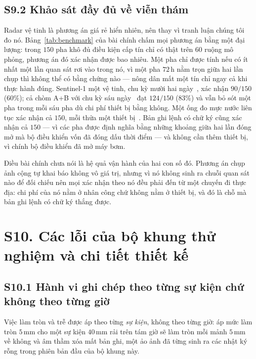 \subsection*{S9.2 Khảo sát đầy đủ về viễn thám}

Radar vệ tinh là phương án giá rẻ hiển nhiên, nên thay vì tranh luận chúng tôi đo nó.
Bảng~\ref{tab:benchmark} của bài chính chấm mọi phương án bằng một đại lượng: trong $150$
pha khô đủ điều kiện cấp tín chỉ có thật trên $60$ ruộng mô phỏng, phương án đó xác nhận
được bao nhiêu. Một pha chỉ được tính nếu có ít nhất một lần quan sát rơi vào trong nó, vì
một pha $72$\,h nằm trọn giữa hai lần chụp thì không thể có bằng chứng nào --- nông dân mất
một tín chỉ ngay cả khi thực hành đúng. Sentinel-1 một vệ tinh, chu kỳ mười hai
ngày~\cite{clauss2017s1}, xác nhận $90/150$ ($60\%$); cả chòm A+B với chu kỳ sáu
ngày~\cite{hashemi2022s1} đạt $124/150$ ($83\%$) và vẫn bỏ sót một pha trong mỗi sáu pha dù
chi phí thiết bị bằng không. Một ống đo mực nước liên tục xác nhận cả $150$, mỗi thửa một
thiết bị~\cite{delacruz2022}. Bản ghi lệnh có chữ ký cũng xác nhận cả $150$ --- vì các pha
được định nghĩa bằng những khoảng giữa hai lần đóng mở mà bộ điều khiển vốn đã đóng dấu
thời điểm --- và không cần thêm thiết bị, vì chính bộ điều khiển đã mở máy bơm.

Điều bài chính chưa nói là hệ quả vận hành của hai con số đó. Phương án chụp ảnh cộng tự
khai báo không vô giá trị, nhưng vì nó không sinh ra chuỗi quan sát nào để đối chiếu nên
mọi xác nhận theo nó đều phải đến từ một chuyến đi thực địa: chi phí của nó nằm ở nhân công
chứ không nằm ở thiết bị, và đó là chỗ mà bản ghi lệnh có chữ ký thắng được.

\section*{S10. Các lỗi của bộ khung thử nghiệm và chi tiết thiết kế}

\subsection*{S10.1 Hành vi ghi chép theo từng sự kiện chứ không theo từng giờ}

Việc làm tròn và trễ được áp theo từng \emph{sự kiện}, không theo từng giờ: áp mức làm tròn
$5$\,mm cho một sự kiện $40$\,mm rải trên tám giờ sẽ làm tròn mỗi mảnh $5$\,mm về không và
âm thầm xóa mất bản ghi, một ảo ảnh đã từng sinh ra các nhật ký rỗng trong phiên bản đầu
của bộ khung này.

